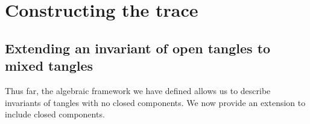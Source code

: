 \chapter{Constructing the trace}\label{ch:trace}
\section{Extending an invariant of open tangles to mixed tangles}
Thus far, the algebraic framework we have defined allows us to describe
invariants of tangles with no closed components. We now provide an extension to
include closed components.



